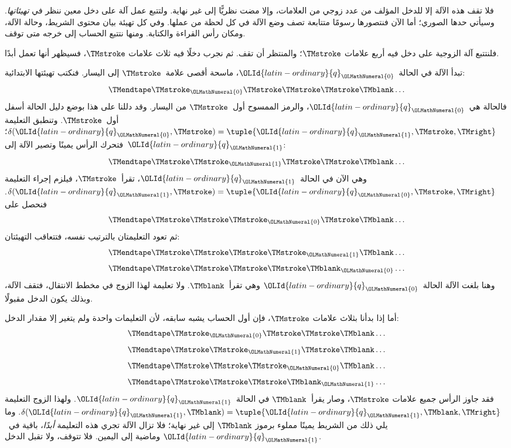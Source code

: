 \documentclass[../../../include/open-logic-section]{subfiles}
\begin{document}
\begin{explain}
فلا تقف هذه الآلة إلا للدخل المؤلف من عدد زوجي من العلامات، وإلا مضت نظريًّا إلى غير نهاية. ولتتبع عمل آلة على دخل معين ننظر في \emph{تهيئاتها}. وسيأتي حدها الصوري؛ أما الآن فنتصورها رسومًا متتابعة تصف وضع الآلة في كل لحظة من عملها. وفي كل تهيئة بيان محتوى الشريط، وحالة الآلة، ومكان رأس القراءة والكتابة. ومنها نتتبع الحساب إلى خرجه متى توقف.

فلنتتبع آلة الزوجية على دخل فيه أربع علامات $\TMstroke$؛ والمنتظر أن تقف. ثم نجرب دخلًا فيه ثلاث علامات $\TMstroke$، فسيظهر أنها تعمل أبدًا.

تبدأ الآلة في الحالة~$\OLId{latin-ordinary}{q}_\OLMathNumeral{0}$، ماسحة أقصى علامة~$\TMstroke$ إلى اليسار. فنكتب تهيئتها الابتدائية:
\[
\TMendtape \TMstroke_\OLMathNumeral{0} \TMstroke \TMstroke \TMstroke \TMblank \ldots
\]
فالحالة هي~$\OLId{latin-ordinary}{q}_\OLMathNumeral{0}$، والرمز الممسوح أول~$\TMstroke$ من اليسار. وقد دللنا على هذا بوضع دليل الحالة أسفل أول~$\TMstroke$. وتنطبق التعليمة $\delta(\OLId{latin-ordinary}{q}_\OLMathNumeral{0},\TMstroke)=\tuple{\OLId{latin-ordinary}{q}_\OLMathNumeral{1},\TMstroke,\TMright}$؛ فتحرك الرأس يمينًا وتصير الآلة إلى~$\OLId{latin-ordinary}{q}_\OLMathNumeral{1}$:
\[
\TMendtape \TMstroke \TMstroke_\OLMathNumeral{1} \TMstroke \TMstroke \TMblank \ldots
\]
وهي الآن في الحالة~$\OLId{latin-ordinary}{q}_\OLMathNumeral{1}$، تقرأ~$\TMstroke$، فيلزم إجراء التعليمة $\delta(\OLId{latin-ordinary}{q}_\OLMathNumeral{1},\TMstroke)=\tuple{\OLId{latin-ordinary}{q}_\OLMathNumeral{0},
  \TMstroke,\TMright}$. فنحصل على
\[
\TMendtape \TMstroke \TMstroke \TMstroke_\OLMathNumeral{0} \TMstroke \TMblank \ldots
\]
ثم تعود التعليمتان بالترتيب نفسه، فتتعاقب التهيئتان:
\[
\TMendtape \TMstroke \TMstroke \TMstroke \TMstroke_\OLMathNumeral{1} \TMblank \ldots
\]
\[
\TMendtape \TMstroke \TMstroke \TMstroke \TMstroke \TMblank_\OLMathNumeral{0} \ldots
\]
وهنا بلغت الآلة الحالة~$\OLId{latin-ordinary}{q}_\OLMathNumeral{0}$ وهي تقرأ~$\TMblank$. ولا تعليمة لهذا الزوج في مخطط الانتقال، فتقف الآلة، وبذلك يكون الدخل مقبولًا.

أما إذا بدأنا بثلاث علامات $\TMstroke$، فإن أول الحساب يشبه سابقه، لأن التعليمات واحدة ولم يتغير إلا مقدار الدخل:
\[
\TMendtape \TMstroke_\OLMathNumeral{0} \TMstroke \TMstroke \TMblank \ldots
\]
\[
\TMendtape \TMstroke \TMstroke_\OLMathNumeral{1} \TMstroke \TMblank \ldots
\]
\[
\TMendtape \TMstroke \TMstroke \TMstroke_\OLMathNumeral{0} \TMblank \ldots
\]
\[
\TMendtape \TMstroke \TMstroke \TMstroke \TMblank_\OLMathNumeral{1} \ldots
\]
فقد جاوز الرأس جميع علامات $\TMstroke$، وصار يقرأ~$\TMblank$ في الحالة~$\OLId{latin-ordinary}{q}_\OLMathNumeral{1}$. ولهذا الزوج التعليمة $\delta(\OLId{latin-ordinary}{q}_\OLMathNumeral{1},\TMblank)=\tuple{\OLId{latin-ordinary}{q}_\OLMathNumeral{1},\TMblank,\TMright}$. وما يلي ذلك من الشريط يمينًا مملوء برموز $\TMblank$ إلى غير نهاية؛ فلا تزال الآلة تجري هذه التعليمة \emph{أبدًا}، باقية في~$\OLId{latin-ordinary}{q}_\OLMathNumeral{1}$ وماضية إلى اليمين. فلا تتوقف، ولا تقبل الدخل.
\end{explain}
\end{document}
